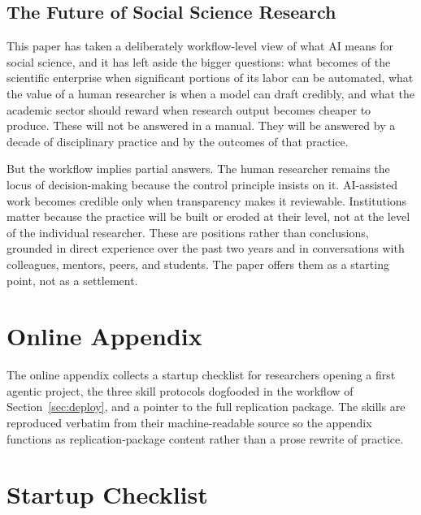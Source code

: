 \documentclass[11pt]{article}
\begin{document}
\subsection{The Future of Social Science Research}
\label{sec:future}

This paper has taken a deliberately workflow-level view of what AI means for social science, and it has left aside the bigger questions: what becomes of the scientific enterprise when significant portions of its labor can be automated, what the value of a human researcher is when a model can draft credibly, and what the academic sector should reward when research output becomes cheaper to produce. These will not be answered in a manual. They will be answered by a decade of disciplinary practice and by the outcomes of that practice.

But the workflow implies partial answers. The human researcher remains the locus of decision-making because the control principle insists on it. AI-assisted work becomes credible only when transparency makes it reviewable. Institutions matter because the practice will be built or eroded at their level, not at the level of the individual researcher. These are positions rather than conclusions, grounded in direct experience over the past two years and in conversations with colleagues, mentors, peers, and students. The paper offers them as a starting point, not as a settlement.




\appendix
\section*{Online Appendix}
\label{sec:appendix}

The online appendix collects a startup checklist for researchers opening a first agentic project, the three skill protocols dogfooded in the workflow of Section~\ref{sec:deploy}, and a pointer to the full replication package. The skills are reproduced verbatim from their machine-readable source so the appendix functions as replication-package content rather than a prose rewrite of practice.

\section{Startup Checklist}
\label{sec:app-checklist}

\end{document}
